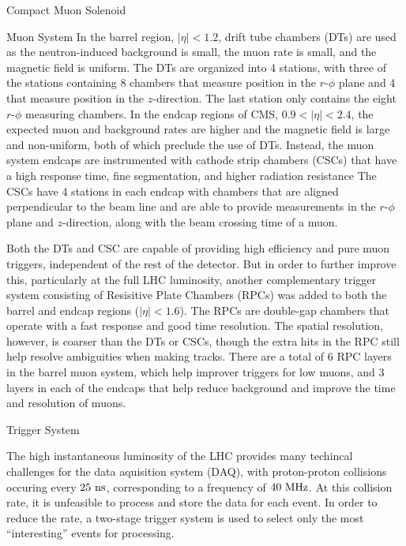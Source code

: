 \begin{section}{Compact Muon Solenoid}
\begin{subsection}{Muon System}
In the barrel region, $|\eta| < 1.2$, drift tube chambers (DTs) are used as the neutron-induced background is small, the muon rate is small, and the magnetic field is uniform.
The DTs are organized into 4 stations, with three of the stations containing 8 chambers that measure position in the $r$-$\phi$ plane and 4 that measure position in the $z$-direction.
The last station only contains the eight $r$-$\phi$ measuring chambers.
In the endcap regions of CMS, $0.9 < |\eta| < 2.4$, the expected muon and background rates are higher and the magnetic field is large and non-uniform, both of which preclude the use of DTs.
Instead, the muon system endcaps are instrumented with cathode strip chambers (CSCs) that have a high response time, fine segmentation, and higher radiation resistance
The CSCs have 4 stations in each endcap with chambers that are aligned perpendicular to the beam line and are able to provide measurements in the $r$-$\phi$ plane and $z$-direction, along with the beam crossing time of a muon.

Both the DTs and CSC are capable of providing high efficiency and pure muon \pT triggers, independent of the rest of the detector.
But in order to further improve this, particularly at the full LHC luminosity, another complementary trigger system consisting of Resisitive Plate Chambers (RPCs) was added to both the barrel and endcap regions ($|\eta| < 1.6$).
The RPCs are double-gap chambers that operate with a fast response and good time resolution.
The spatial resolution, however, is coarser than the DTs or CSCs, though the extra hits in the RPC still help resolve ambiguities when making tracks.
There are a total of 6 RPC layers in the barrel muon system, which help improver triggers for low \pT muons, and 3 layers in each of the endcaps that help reduce background and improve the time and \pT resolution of muons.

\end{subsection}

\begin{subsection}{Trigger System}

The high instantaneous luminosity of the LHC provides many techincal challenges for the data aquisition system (DAQ), with proton-proton collisions occuring every $25~\mathrm{ns}$, corresponding to a frequency of $40~\mathrm{MHz}$. 
At this collision rate, it is unfeasible to process and store the data for each event.
In order to reduce the rate, a two-stage trigger system is used to select only the most ``interesting'' events for processing.


\end{subsection}
\end{section}
